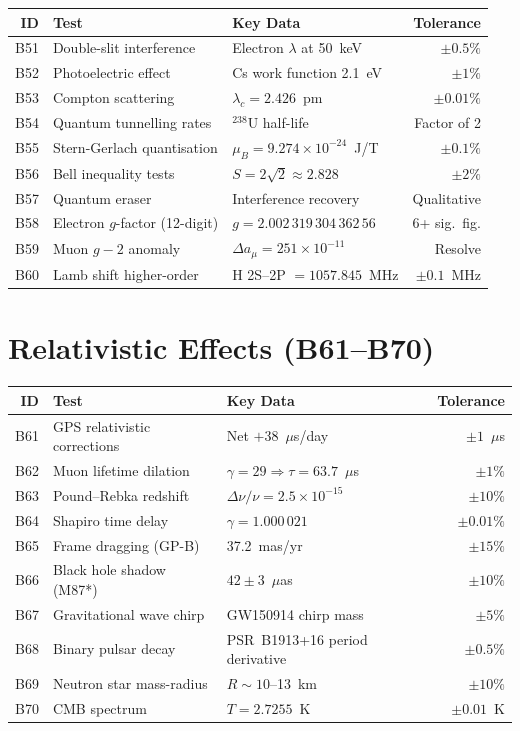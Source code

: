 \documentclass[12pt,a4paper]{report}
\begin{document}
\begin{center}
\small
\begin{tabular}{rllr}
\toprule
\textbf{ID} & \textbf{Test} & \textbf{Key Data} & \textbf{Tolerance} \\
\midrule
B51 & Double-slit interference & Electron $\lambda$ at 50~keV & $\pm 0.5\%$ \\
B52 & Photoelectric effect & Cs work function 2.1~eV & $\pm 1\%$ \\
B53 & Compton scattering & $\lambda_c = 2.426$~pm & $\pm 0.01\%$ \\
B54 & Quantum tunnelling rates & $^{238}$U half-life & Factor of 2 \\
B55 & Stern-Gerlach quantisation & $\mu_B = 9.274 \times 10^{-24}$~J/T & $\pm 0.1\%$ \\
B56 & Bell inequality tests & $S = 2\sqrt{2} \approx 2.828$ & $\pm 2\%$ \\
B57 & Quantum eraser & Interference recovery & Qualitative \\
B58 & Electron $g$-factor (12-digit) & $g = 2.002\,319\,304\,362\,56$ & 6+ sig.\ fig. \\
B59 & Muon $g-2$ anomaly & $\Delta a_\mu = 251 \times 10^{-11}$ & Resolve \\
B60 & Lamb shift higher-order & H 2S--2P $= 1057.845$~MHz & $\pm 0.1$~MHz \\
\bottomrule
\end{tabular}
\end{center}

\section{Relativistic Effects (B61--B70)}

\begin{center}
\small
\begin{tabular}{rllr}
\toprule
\textbf{ID} & \textbf{Test} & \textbf{Key Data} & \textbf{Tolerance} \\
\midrule
B61 & GPS relativistic corrections & Net $+38$~$\mu$s/day & $\pm 1$~$\mu$s \\
B62 & Muon lifetime dilation & $\gamma = 29 \Rightarrow \tau = 63.7$~$\mu$s & $\pm 1\%$ \\
B63 & Pound--Rebka redshift & $\Delta\nu/\nu = 2.5 \times 10^{-15}$ & $\pm 10\%$ \\
B64 & Shapiro time delay & $\gamma = 1.000\,021$ & $\pm 0.01\%$ \\
B65 & Frame dragging (GP-B) & 37.2~mas/yr & $\pm 15\%$ \\
B66 & Black hole shadow (M87*) & $42 \pm 3$~$\mu$as & $\pm 10\%$ \\
B67 & Gravitational wave chirp & GW150914 chirp mass & $\pm 5\%$ \\
B68 & Binary pulsar decay & PSR~B1913+16 period derivative & $\pm 0.5\%$ \\
B69 & Neutron star mass-radius & $R \sim 10$--13~km & $\pm 10\%$ \\
B70 & CMB spectrum & $T = 2.7255$~K & $\pm 0.01$~K \\
\bottomrule
\end{tabular}
\end{center}
\end{document}
